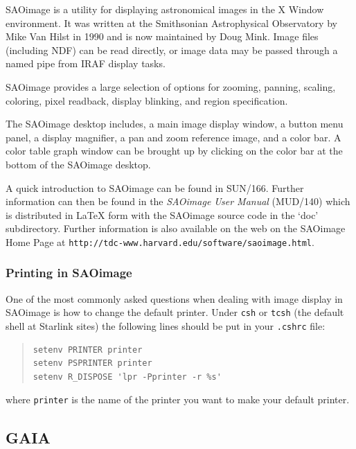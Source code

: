 \documentclass[twoside,11pt]{article}
\newcommand{\htmladdnormallink}[2]{#1}
\newcommand{\latex}[1]{#1}
\newcommand{\xref}[3]{#1}
\newcommand{\xlabel}[1]{}
\begin{document}
\htmladdnormallink{SAOimage}{http://tdc-www.harvard.edu/software/saoimage.html} is a utility for displaying astronomical images in the X Window environment. It was written at the Smithsonian Astrophysical Observatory by Mike Van Hilst in 1990 and is now maintained by Doug Mink. Image files (including \xref{NDF}{sun33}{}) can be read directly, or image data may be passed through a named pipe from IRAF display tasks. 

SAOimage provides a large selection of options for zooming, panning, scaling, coloring, pixel readback, display blinking, and region specification. 

The SAOimage desktop includes, a main image display window, a button menu panel, a display magnifier, a pan and zoom reference image, and a color bar. A color table graph window can be brought up by clicking on the color bar at the bottom of the SAOimage desktop.

A quick introduction to SAOimage can be found in \xref{SUN/166}{sun166}{}. Further information can then be found in the {\em SAOimage User Manual} (MUD/140) which is distributed in LaTeX form with the SAOimage source code in the `doc' subdirectory. Further information is also available on the web on the \htmladdnormallink{SAOimage Home Page}{http://tdc-www.harvard.edu/software/saoimage.html}\latex{ at {\tt http://tdc-www.harvard.edu/software/saoimage.html}}.

\subsubsection{Printing in SAOimage}

One of the most commonly asked questions when dealing with image display in SAOimage is how to change the default printer. Under {\tt csh} or {\tt tcsh} (the default shell at Starlink sites) the following lines should be put in your {\tt .cshrc} file:

\small
\begin{quote}
\begin{verbatim}
setenv PRINTER printer
setenv PSPRINTER printer
setenv R_DISPOSE 'lpr -Pprinter -r %s'
\end{verbatim}
\end{quote}
\normalsize

where \verb+printer+ is the name of the printer you want to make your default printer.

\subsection{\xlabel{sc15_gaia}GAIA\label{sc15_gaia}}
\end{document}
